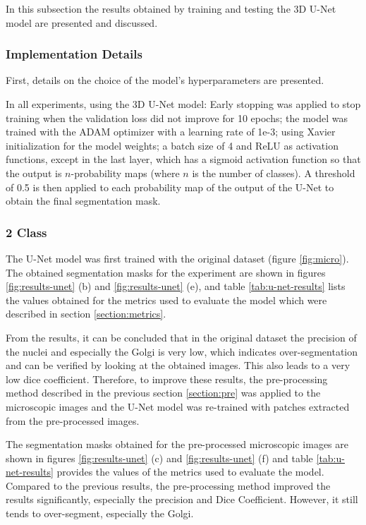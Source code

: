 In this subsection the results obtained by training and testing the 3D U-Net model are presented and discussed.

\subsubsection*{Implementation Details}

First, details on the choice of the model's hyperparameters are presented.

In all experiments, using the \ac{3D} U-Net model: Early stopping was applied to stop training when the validation loss did not improve for 10 epochs; the model was trained with the ADAM optimizer with a learning rate of 1e-3; using Xavier initialization for the model weights; a batch size of 4 and \ac{ReLU} as activation functions, except in the last layer, which has a sigmoid activation function so that the output is $n$-probability maps (where $n$ is the number of classes). A threshold of 0.5 is then applied to each probability map of the output of the U-Net to obtain the final segmentation mask.


\subsubsection*{2 Class}

The U-Net model was first trained with the original dataset (figure \ref{fig:micro}). The obtained segmentation masks for the experiment are shown in figures \ref{fig:results-unet} (b) and \ref{fig:results-unet} (e), and table \ref{tab:u-net-results} lists the values obtained for the metrics used to evaluate the model which were described in section \ref{section:metrics}.

From the results, it can be concluded that in the original dataset the precision of the nuclei and especially the Golgi is very low, which indicates over-segmentation and can be verified by looking at the obtained images. This also leads to a very low dice coefficient. Therefore, to improve these results, the pre-processing method described in the previous section \ref{section:pre} was applied to the microscopic images and the U-Net model was re-trained with patches extracted from the pre-processed images.

The segmentation masks obtained for the pre-processed microscopic images are shown in figures \ref{fig:results-unet} (c) and \ref{fig:results-unet} (f) and table \ref{tab:u-net-results} provides the values of the metrics used to evaluate the model. Compared to the previous results, the pre-processing method improved the results significantly, especially the precision and Dice Coefficient. However, it still tends to over-segment, especially the Golgi.

